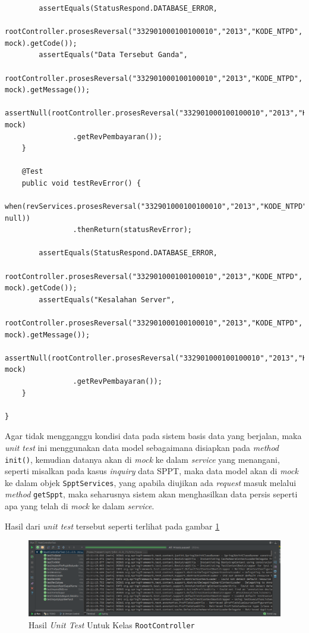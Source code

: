 \documentclass[pdftex,12pt, oneside]{article}
\begin{document}
\begin{enumerate}[A.]
\begin{enumerate}[1.]
\begin{lstlisting}
        assertEquals(StatusRespond.DATABASE_ERROR,
                rootController.prosesReversal("332901000100100010","2013","KODE_NTPD", mock).getCode());
        assertEquals("Data Tersebut Ganda",
                rootController.prosesReversal("332901000100100010","2013","KODE_NTPD", mock).getMessage());
        assertNull(rootController.prosesReversal("332901000100100010","2013","KODE_NTPD", mock)
                .getRevPembayaran());
    }

    @Test
    public void testRevError() {
        when(revServices.prosesReversal("332901000100100010","2013","KODE_NTPD", null))
                .thenReturn(statusRevError);

        assertEquals(StatusRespond.DATABASE_ERROR,
                rootController.prosesReversal("332901000100100010","2013","KODE_NTPD", mock).getCode());
        assertEquals("Kesalahan Server",
                rootController.prosesReversal("332901000100100010","2013","KODE_NTPD", mock).getMessage());
        assertNull(rootController.prosesReversal("332901000100100010","2013","KODE_NTPD", mock)
                .getRevPembayaran());
    }

}
    \end{lstlisting}
    
    Agar tidak mengganggu kondisi data pada sistem basis data yang berjalan, maka \textit{unit test} ini menggunakan data model sebagaimana disiapkan pada \textit{method} \texttt{init()}, kemudian datanya akan di \textit{mock} ke dalam \textit{service} yang menangani, seperti misalkan pada kasus \textit{inquiry} data SPPT, maka data model akan di \textit{mock} ke dalam objek \texttt{SpptServices}, yang apabila diujikan ada \textit{request} masuk melalui \textit{method} \texttt{getSppt}, maka seharusnya sistem akan menghasilkan data persis seperti apa yang telah di \textit{mock} ke dalam \textit{service}.
    
    Hasil dari \textit{unit test} tersebut seperti terlihat pada gambar \ref{fig:root-controller-ut}
    
    \begin{figure}[H]
      \centering
      \includegraphics[width=1\textwidth]{./resources/01-root-controller-ut}
      \caption{Hasil \textit{Unit Test} Untuk Kelas \texttt{RootController}}
      \label{fig:root-controller-ut}
    \end{figure}
    

\end{enumerate}
\end{enumerate}
\end{document}
